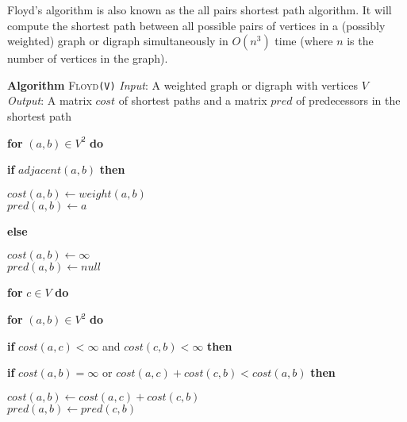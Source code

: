 \documentclass[12pt]{article}
\newcommand{\Lindent}{0.4in}
\newenvironment{Lalgorithm}[4]{
\textbf{Algorithm} \textsc{#1}\texttt{(#2)}\newline
\textit{Input}: #3\newline
\textit{Output}: #4\newline

}{}
\newcommand{\Lif}[2]{\textbf{if} #1 \textbf{then}\\\hspace*{\Lindent}\parbox{\textwidth}{#2}}
\newcommand{\Lelse}[1]{\textbf{else}\\\hspace*{\Lindent}\parbox{\textwidth}{#1}}
\newcommand{\Lfor}[2]{\textbf{for} #1 \textbf{do}\\\hspace*{\Lindent}\parbox{\textwidth}{#2}}
\begin{document}
Floyd's algorithm is also known as the all pairs shortest path algorithm.  It will compute the shortest path between all possible pairs of vertices in a (possibly weighted) graph or digraph simultaneously in $O(n^3)$ time (where $n$ is the number of vertices in the graph).

\begin{Lalgorithm}{Floyd}{V}{A weighted graph or digraph with vertices $V$}{A matrix $cost$ of shortest paths and a matrix $pred$ of predecessors in the shortest path}
\Lfor{$(a,b) \in V^2$}{
\Lif{$adjacent(a,b)$}{
$cost(a,b) \gets weight(a,b)$\\
$pred(a,b) \gets a$
}
\Lelse{
$cost(a,b) \gets \infty$\\
$pred(a,b) \gets null$
}
}

\Lfor{$c \in V$}{
\Lfor{$(a,b) \in V^2$}{
\Lif{$cost(a,c) < \infty$ and $cost(c,b) < \infty$}{
\Lif{$cost(a,b) = \infty$ or $cost(a,c) + cost(c,b) < cost(a,b)$}{
$cost(a,b) \gets cost(a,c)+cost(c,b)$ \\
$pred(a,b) \gets pred(c,b)$
}
}
}
}

\end{Lalgorithm}
\end{document}
